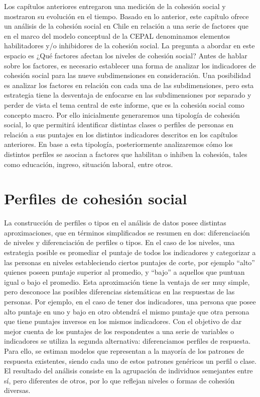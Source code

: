 \documentclass[
  12pt,
]{book}
\begin{document}
Los capítulos anteriores entregaron una medición de la cohesión social y mostraron su evolución en el tiempo. Basado en lo anterior, este capítulo ofrece un análisis de la cohesión social en Chile en relación a una serie de factores que en el marco del modelo conceptual de la CEPAL denominamos elementos habilitadores y/o inhibidores de la cohesión social. La pregunta a abordar en este espacio es ¿Qué factores afectan los niveles de cohesión social? Antes de hablar sobre los factores, es necesario establecer una forma de analizar los indicadores de cohesión social para las nueve subdimensiones en consideración. Una posibilidad es analizar los factores en relación con cada una de las subdimensiones, pero esta estrategia tiene la desventaja de enfocarse en las subdimensiones por separado y perder de vista el tema central de este informe, que es la cohesión social como concepto macro. Por ello inicialmente generaremos una tipología de cohesión social, lo que permitirá identificar distintas clases o perfiles de personas en relación a sus puntajes en los distintos indicadores descritos en los capítulos anteriores. En base a esta tipología, posteriormente analizaremos cómo los distintos perfiles se asocian a factores que habilitan o inhiben la cohesión, tales como educación, ingreso, situación laboral, entre otros.

\hypertarget{perfiles-de-cohesiuxf3n-social}{%
\section{Perfiles de cohesión social}\label{perfiles-de-cohesiuxf3n-social}}

La construcción de perfiles o tipos en el análisis de datos posee distintas aproximaciones, que en términos simplificados se resumen en dos: diferenciación de niveles y diferenciación de perfiles o tipos. En el caso de los niveles, una estrategia posible es promediar el puntaje de todos los indicadores y categorizar a las personas en niveles estableciendo ciertos puntajes de corte, por ejemplo ``alto'' quienes poseen puntaje superior al promedio, y ``bajo'' a aquellos que puntuan igual o bajo el promedio. Esta aproximación tiene la ventaja de ser muy simple, pero desconoce las posibles diferencias sistemáticas en las respuestas de las personas. Por ejemplo, en el caso de tener dos indicadores, una persona que posee alto puntaje en uno y bajo en otro obtendrá el mismo puntaje que otra persona que tiene puntajes inversos en los mismos indicadores. Con el objetivo de dar mejor cuenta de los puntajes de los respondentes a una serie de variables o indicadores se utiliza la segunda alternativa: diferenciamos perfiles de respuesta. Para ello, se estiman modelos que representan a la mayoría de los patrones de respuesta existentes, siendo cada uno de estos patrones genéricos un perfil o clase. El resultado del análisis consiste en la agrupación de individuos semejantes entre sí, pero diferentes de otros, por lo que reflejan niveles o formas de cohesión diversas.
\end{document}
